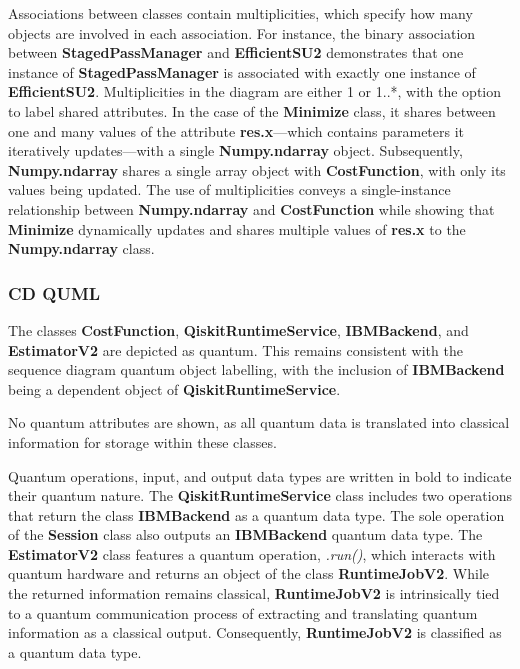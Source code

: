 \documentclass{article}
\begin{document}
Associations between classes contain multiplicities, which specify how many objects are involved in each association. For instance, the binary association between \textbf{StagedPassManager} and \textbf{EfficientSU2} demonstrates that one instance of \textbf{StagedPassManager} is associated with exactly one instance of \textbf{EfficientSU2}. Multiplicities in the diagram are either 1 or 1..*, with the option to label shared attributes. In the case of the \textbf{Minimize} class, it shares between one and many values of the attribute \textbf{res.x}—which contains parameters it iteratively updates—with a single \textbf{Numpy.ndarray} object. 
Subsequently, \textbf{Numpy.ndarray} shares a single array object with \textbf{CostFunction}, with only its values being updated. The use of multiplicities conveys a single-instance relationship between \textbf{Numpy.ndarray} and \textbf{CostFunction} while showing that \textbf{Minimize} dynamically updates and shares multiple values of \textbf{res.x} to the \textbf{Numpy.ndarray} class.

\subsubsection{CD QUML}

The classes \textbf{CostFunction}, \textbf{QiskitRuntimeService}, \textbf{IBMBackend}, and \textbf{EstimatorV2} are depicted as quantum. This remains consistent with the sequence diagram quantum object labelling, with the inclusion of \textbf{IBMBackend} being a dependent object of \textbf{QiskitRuntimeService}.

No quantum attributes are shown, as all quantum data is translated into classical information for storage within these classes.

Quantum operations, input, and output data types are written in bold to indicate their quantum nature. The \textbf{QiskitRuntimeService} class includes two operations that return the class \textbf{IBMBackend} as a quantum data type. The sole operation of the \textbf{Session} class also outputs an \textbf{IBMBackend} quantum data type. The \textbf{EstimatorV2} class features a quantum operation, \textit{.run()}, which interacts with quantum hardware and returns an object of the class \textbf{RuntimeJobV2}. While the returned information remains classical, \textbf{RuntimeJobV2} is intrinsically tied to a quantum communication process of extracting and translating quantum information as a classical output. Consequently, \textbf{RuntimeJobV2} is classified as a quantum data type.
\end{document}
